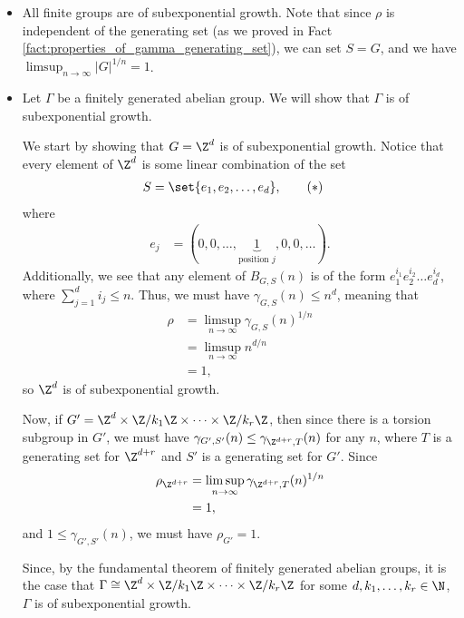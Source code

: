 \begin{example}\hfill
  \begin{itemize}
    \item All finite groups are of subexponential growth. Note that since $\rho$ is independent of the generating set (as we proved in Fact \ref{fact:properties_of_gamma_generating_set}), we can set $S = G$, and we have $\limsup_{n\rightarrow\infty} \left\vert G \right\vert^{1/n} = 1$.
    \item Let $\Gamma$ be a finitely generated abelian group. We will show that $\Gamma$ is of subexponential growth.\newline

      We start by showing that $G = \Z^d$ is of subexponential growth. Notice that every element of $\Z^d$ is some linear combination of the set
      \begin{align*}
        S &= \set{e_1,e_2,\dots,e_d},\label{eq:generating_set_free_abelian_group}\tag{\textasteriskcentered}
      \end{align*}
      where
      \begin{align*}
        e_{j} &= (0,0,\dots,\underbrace{1}_{\text{position $j$}},0,0,\dots).
      \end{align*}
      Additionally, we see that any element of $B_{G,S}(n)$ is of the form $e_1^{i_1}e_2^{i_2}\dots e_d^{i_d}$, where $\sum_{j=1}^{d} i_j \leq n$. Thus, we must have $\gamma_{G,S}(n) \leq n^{d}$, meaning that 
      \begin{align*}
        \rho &= \limsup_{n\rightarrow\infty} \gamma_{G,S}(n)^{1/n}\\
             &= \limsup_{n\rightarrow\infty}n^{d/n}\\
             &= 1,
      \end{align*}
      so $\Z^d$ is of subexponential growth.\newline

      Now, if $G' = \Z^d\times \Z/k_1\Z\times \cdots \times \Z/k_r\Z$, then since there is a torsion subgroup in $G'$, we must have $\gamma_{G',S'}(n) \leq \gamma_{\Z^{d+r},T}(n)$ for any $n$, where $T$ is a generating set for $\Z^{d+r}$ and $S'$ is a generating set for $G'$. Since
      \begin{align*}
        \rho_{\Z^{d+r}} &= \limsup_{n\rightarrow\infty}\gamma_{\Z^{d+r},T}(n)^{1/n}\\
                        &= 1,
      \end{align*}
      and $1 \leq \gamma_{G',S'}(n)$, we must have $\rho_{G'} = 1$.\newline

      Since, by the fundamental theorem of finitely generated abelian groups, it is the case that $\Gamma\cong \Z^{d}\times \Z/k_1\Z\times\cdots\times \Z/k_r\Z$ for some $d,k_1,\dots,k_r\in \N$, $\Gamma$ is of subexponential growth.
  \end{itemize}
\end{example}


